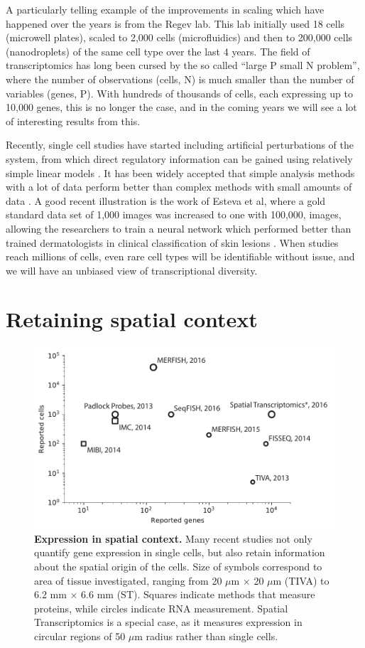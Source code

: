 A particularly telling example of the improvements in scaling which have happened over the years is from the Regev lab. This lab initially used 18 cells \cite{Shalek2014-gu} (microwell plates), scaled to 2,000 cells \cite{Shalek2014-gu} (microfluidics) and then to 200,000 cells \cite{Dixit2016-qx} (nanodroplets) of the same cell type over the last 4 years. The field of transcriptomics has long been cursed by the so called ``large P small N problem'', where the number of observations (cells, N) is much smaller than the number of variables (genes, P). With hundreds of thousands of cells, each expressing up to 10,000 genes, this is no longer the case, and in the coming years we will see a lot of interesting results from this.

Recently, single cell studies have started including artificial perturbations of the system, from which direct regulatory information can be gained using relatively simple linear models \cite{Dixit2016-qx, Jaitin2016-sj, Adamson2016-mt, Datlinger2017-aa}. It has been widely accepted that simple analysis methods with a lot of data perform better than complex methods with small amounts of data \cite{Halevy2009-uj}. A good recent illustration is the work of Esteva et al, where a gold standard data set of 1,000 images was increased to one with 100,000, images, allowing the researchers to train a neural network which performed better than trained dermatologists in clinical classification of skin lesions \cite{Esteva2017-cw}. When studies reach millions of cells, even rare cell types will be identifiable without issue, and we will have an unbiased view of transcriptional diversity.

\section{Retaining spatial context}

\begin{figure}
    \centering
    \centerline{\includegraphics[width=.75\textwidth]{"SpatialTechnologies"}}
    \caption[Expression in spatial context]{\textbf{Expression in spatial context.} Many recent studies not only quantify gene expression in single cells, but also retain information about the spatial origin of the cells. Size of symbols correspond to area of tissue investigated, ranging from 20  \(\mu\)m \(\times\) 20  \(\mu\)m (TIVA) to 6.2 mm \(\times\) 6.6 mm (ST). Squares indicate methods that measure proteins, while circles indicate RNA measurement. Spatial Transcriptomics is a special case, as it measures expression in circular regions of 50 \(\mu\)m radius rather than single cells.}
    \label{fig:spatial}
\end{figure}


